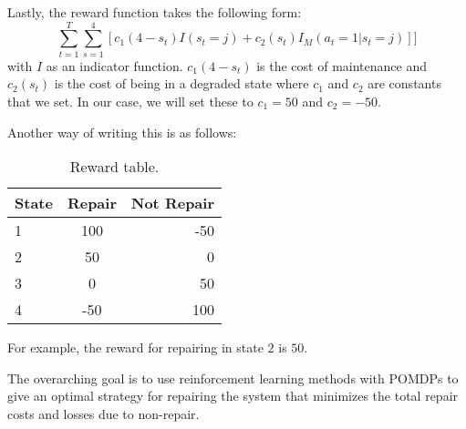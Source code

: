 \documentclass[english]{article}
\numberwithin{equation}{section}
\begin{document}
	Lastly, the reward function takes the following form:
	$$\sum_{t=1}^T \sum_{s=1}^4 [c_1(4-s_t)I(s_t=j) + c_2(s_t)I_M(a_t=1|s_t=j)]]$$
	with $I$ as an indicator function. $c_1(4-s_t)$ is the cost of maintenance and $c_2(s_t)$ is the cost of being in a degraded state where $c_1$ and $c_2$ are constants that we set. In our case, we will set these to $c_1=50$ and $c_2=-50$.
	
	Another way of writing this is as follows:
	
%	
	 
	 \begin{table}[h!]
	 	\begin{center}
	 		\caption{Reward table.}
	 		\label{tab:table1}
	 		\begin{tabular}{l|c|r} %
	 			\textbf{State} & \textbf{Repair} & \textbf{Not Repair}\\
	 			\hline
	 			1 & 100 & -50\\
	 			2 & 50 & 0\\
	 			3 & 0 & 50\\
	 			4 & -50 & 100
	 		\end{tabular}
	 	\end{center}
	 \end{table}
	 
	 For example, the reward for repairing in state $2$ is $50$.
	
	The overarching goal is to use reinforcement learning methods with POMDPs to give an optimal strategy for repairing the system that minimizes the total repair costs and losses due to non-repair.
	
\end{document}
